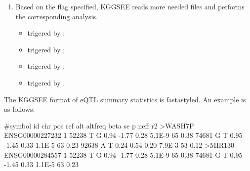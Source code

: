 \documentclass[letterpaper,10pt,english,openany,oneside]{sphinxmanual}
\begin{document}
\begin{enumerate}
\item {} 
\sphinxAtStartPar
Based on the flag specified, KGGSEE reads more needed files and performs the corresponding analysis.
\begin{itemize}
\item {} 
\sphinxAtStartPar
{\hyperref[\detokenize{detailed_document:detail-ecs}]{}} trigered by ;

\item {} 
\sphinxAtStartPar
{\hyperref[\detokenize{detailed_document:detail-dese}]{}} trigered by ;

\item {} 
\sphinxAtStartPar
{\hyperref[\detokenize{detailed_document:detail-emic}]{}} trigered by ;

\item {} 
\sphinxAtStartPar
{\hyperref[\detokenize{detailed_document:detail-h2}]{}} trigered by .

\end{itemize}

\end{enumerate}
\label{\detokenize{detailed_document:eqtl-file}}
\sphinxAtStartPar
The KGGSEE format of eQTL summary statistics is fasta\sphinxhyphen{}styled. An example is as follows:

\begin{sphinxVerbatim}[commandchars=\\\{\}]
#symbol   id    chr     pos     ref     alt     altfreq beta    se     p      neff   r2
>WASH7P ENSG00000227232 1
52238   T       G       0.94    -1.77   0.28    5.1E-9  65      0.38
74681   G       T       0.95    -1.45   0.33    1.1E-5  63      0.23
92638   A       T       0.24    0.54    0.20    7.9E-3  53      0.12
>MIR130 ENSG00000284557 1
52238   T       G       0.94    -1.77   0.28    5.1E-9  65      0.38
74681   G       T       0.95    -1.45   0.33    1.1E-5  63      0.23
\end{sphinxVerbatim}
\end{document}
